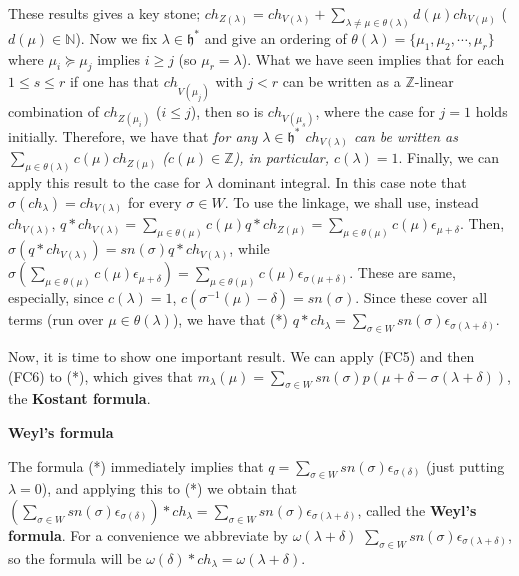 \documentclass{article}
\newcommand{\NaN}{\mathbb{N}}
\newcommand{\InZ}{\mathbb{Z}}
\newcommand{\lie}[1]{\mathfrak{#1}}
\begin{document}
These results gives a key stone; $ch_{Z(\lambda)} = ch_{V(\lambda)} + \sum_{\lambda \ne \mu \in \theta(\lambda)} d(\mu) ch_{V(\mu)}$ ($d(\mu) \in \NaN$).
Now we fix $\lambda \in \lie{h}^*$ and give an ordering of $\theta(\lambda) = \{\mu_1, \mu_2, \cdots, \mu_r\}$ where $\mu_i \succeq \mu_j$ implies $i \ge j$ (so $\mu_r = \lambda$).
What we have seen implies that for each $1 \le s \le r$ if one has that $ch_{V(\mu_j)}$ with $j < r$ can be written as a $\InZ$-linear combination of $ch_{Z(\mu_i)}$ ($i \le j$), then so is $ch_{V(\mu_s)}$, where the case for $j = 1$ holds initially.
Therefore, we have that \textit{for any $\lambda \in \lie{h}^*$ $ch_{V(\lambda)}$ can be written as $\sum_{\mu \in \theta(\lambda)} c(\mu) ch_{Z(\mu)}$ ($c(\mu) \in \InZ$), in particular, $c(\lambda) = 1$}.
Finally, we can apply this result to the case for $\lambda$ dominant integral.
In this case note that $\sigma(ch_\lambda) = ch_{V(\lambda)}$ for every $\sigma \in W$.
To use the linkage, we shall use, instead $ch_{V(\lambda)}$, $q * ch_{V(\lambda)} = \sum_{\mu \in \theta(\mu)} c(\mu) q * ch_{Z(\mu)} = \sum_{\mu \in \theta(\mu)} c(\mu) \epsilon_{\mu + \delta}$.
Then, $\sigma(q * ch_{V(\lambda)}) = sn(\sigma) q * ch_{V(\lambda)}$, while $\sigma(\sum_{\mu \in \theta(\mu)} c(\mu) \epsilon_{\mu + \delta}) = \sum_{\mu \in \theta(\mu)} c(\mu) \epsilon_{\sigma(\mu + \delta)}$.
These are same, especially, since $c(\lambda) = 1$, $c(\sigma^{-1}(\mu) - \delta) = sn(\sigma)$.
Since these cover all terms (run over $\mu \in \theta(\lambda)$), we have that (*) $q * ch_\lambda = \sum_{\sigma \in W} sn(\sigma) \epsilon_{\sigma(\lambda + \delta)}$.

Now, it is time to show one important result.
We can apply (FC5) and then (FC6) to (*), which gives that $m_\lambda(\mu) = \sum_{\sigma \in W} sn(\sigma) p(\mu + \delta - \sigma(\lambda + \delta))$, the \textbf{Kostant formula}.

\newpage

\textbf{Weyl's formula}

The formula (*) immediately implies that $q = \sum_{\sigma \in W} sn(\sigma) \epsilon_{\sigma(\delta)}$ (just putting $\lambda = 0$), and applying this to (*) we obtain that $(\sum_{\sigma \in W} sn(\sigma) \epsilon_{\sigma(\delta)}) * ch_\lambda = \sum_{\sigma \in W} sn(\sigma) \epsilon_{\sigma(\lambda + \delta)}$, called the \textbf{Weyl's formula}.
For a convenience we abbreviate by $\omega(\lambda + \delta)$ $\sum_{\sigma \in W} sn(\sigma) \epsilon_{\sigma(\lambda + \delta)}$, so the formula will be $\omega(\delta) * ch_\lambda = \omega(\lambda + \delta)$.
\end{document}
